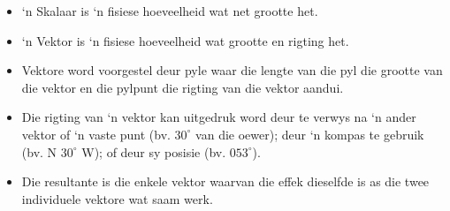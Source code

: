 \begin{itemize}
\item ‘n Skalaar is ‘n fisiese hoeveelheid wat net grootte het.
\item ‘n Vektor is ‘n fisiese hoeveelheid wat grootte en rigting het.
\item Vektore word voorgestel deur pyle waar die lengte van die pyl die grootte van die vektor en die pylpunt die rigting van die vektor aandui.
\item Die rigting van ‘n vektor kan uitgedruk word deur te verwys na ‘n ander vektor of ‘n vaste punt (bv. $30^{\circ}$ van die oewer); deur ‘n kompas te gebruik (bv. N $30^\circ$ W); of deur sy posisie (bv. $053 ^\circ$).
\item Die resultante is die enkele vektor waarvan die effek dieselfde is as die twee individuele vektore wat saam werk. 
\end{itemize}
